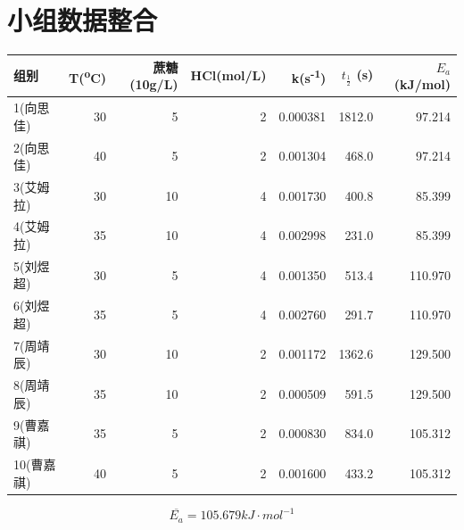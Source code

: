 \documentclass[11pt]{report}
\def \qt {t_{\frac{1}{2}}}
\begin{document}
\section{小组数据整合}
\label{sec:org3d0171c}
\begin{center}
\begin{tabular}{lrrrrrr}
组别 & T(\textsuperscript{o}C) & 蔗糖(10g/L) & HCl(mol/L) & k(s\textsuperscript{-1}) & \(\qt\) (s) & \(E_{a}\) (kJ/mol)\\
\hline
1(向思佳) & 30 & 5 & 2 & 0.000381 & 1812.0 & 97.214\\
2(向思佳) & 40 & 5 & 2 & 0.001304 & 468.0 & 97.214\\
3(艾姆拉) & 30 & 10 & 4 & 0.001730 & 400.8 & 85.399\\
4(艾姆拉) & 35 & 10 & 4 & 0.002998 & 231.0 & 85.399\\
5(刘煜超) & 30 & 5 & 4 & 0.001350 & 513.4 & 110.970\\
6(刘煜超) & 35 & 5 & 4 & 0.002760 & 291.7 & 110.970\\
7(周靖辰) & 30 & 10 & 2 & 0.001172 & 1362.6 & 129.500\\
8(周靖辰) & 35 & 10 & 2 & 0.000509 & 591.5 & 129.500\\
9(曹嘉祺) & 35 & 5 & 2 & 0.000830 & 834.0 & 105.312\\
10(曹嘉祺) & 40 & 5 & 2 & 0.001600 & 433.2 & 105.312\\
\end{tabular}
\end{center}
\[
\overline{E_{a}}=105.679kJ\cdot mol^{-1}
\]
\end{document}
